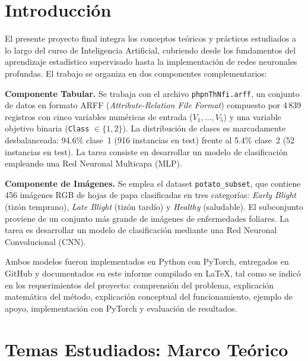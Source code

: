 \documentclass[12pt, a4paper]{article}
\begin{document}
\newpage
\tableofcontents
\newpage

\section{Introducción}
\label{sec:intro}

El presente proyecto final integra los conceptos teóricos y prácticos
estudiados a lo largo del curso de Inteligencia Artificial, cubriendo
desde los fundamentos del aprendizaje estadístico supervisado hasta la
implementación de redes neuronales profundas. El trabajo se organiza
en dos componentes complementarios:

\textbf{Componente Tabular.} Se trabaja con el archivo
\texttt{phpnThNfi.arff}, un conjunto de datos en formato ARFF
(\textit{Attribute-Relation File Format}) compuesto por 4\,839
registros con cinco variables numéricas de entrada ($V_1, \ldots, V_5$)
y una variable objetivo binaria (\texttt{Class} $\in \{1, 2\}$). La
distribución de clases es marcadamente desbalanceada: 94.6\% clase~1
(916 instancias en test) frente al 5.4\% clase~2 (52 instancias en
test). La tarea consiste en desarrollar un modelo de clasificación
empleando una Red Neuronal Multicapa (MLP).

\textbf{Componente de Imágenes.} Se emplea el dataset
\texttt{potato\_subset}, que contiene 456 imágenes RGB de hojas de
papa clasificadas en tres categorías: \textit{Early Blight} (tizón
temprano), \textit{Late Blight} (tizón tardío) y \textit{Healthy}
(saludable). El subconjunto proviene de un conjunto más grande de
imágenes de enfermedades foliares. La tarea es desarrollar un modelo
de clasificación mediante una Red Neuronal Convolucional (CNN).

Ambos modelos fueron implementados en Python con PyTorch, entregados
en GitHub y documentados en este informe compilado en \LaTeX, tal como
se indicó en los requerimientos del proyecto:
comprensión del problema, explicación matemática del método,
explicación conceptual del funcionamiento, ejemplo de apoyo,
implementación con PyTorch y evaluación de resultados.

\section{Temas Estudiados: Marco Teórico}
\label{sec:teoria}
\end{document}
